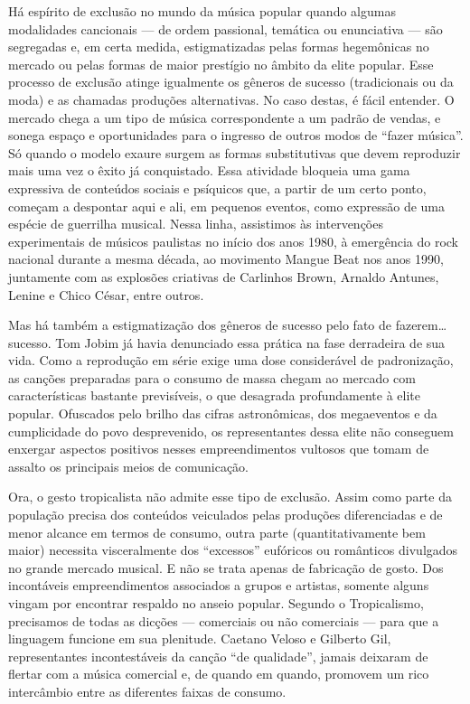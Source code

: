 Há espírito de exclusão no mundo da música popular quando algumas
modalidades cancionais --- de ordem passional, temática ou enunciativa
--- são segregadas e, em certa medida, estigmatizadas pelas formas
hegemônicas no mercado ou pelas formas de maior prestígio no âmbito da
elite popular. Esse processo de exclusão atinge igualmente os gêneros de
sucesso (tradicionais ou da moda) e as chamadas produções alternativas.
No caso destas, é fácil entender. O mercado chega a um tipo de música
correspondente a um padrão de vendas, e sonega espaço e oportunidades
para o ingresso de outros modos de ``fazer música''. Só quando o modelo
exaure surgem as formas substitutivas que devem reproduzir mais uma vez
o êxito já conquistado. Essa atividade bloqueia uma gama expressiva de
conteúdos sociais e psíquicos que, a partir de um certo ponto, começam a
despontar aqui e ali, em pequenos eventos, como expressão de uma espécie
de guerrilha musical. Nessa linha, assistimos às intervenções
experimentais de músicos paulistas no início dos anos 1980, à emergência
do rock nacional durante a mesma década, ao movimento Mangue Beat nos
anos 1990, juntamente com as explosões criativas de Carlinhos Brown,
Arnaldo Antunes, Lenine e Chico César, entre outros.

Mas há também a estigmatização dos gêneros de sucesso pelo fato de
fazerem\ldots sucesso. Tom Jobim já havia denunciado essa prática na fase
derradeira de sua vida. Como a reprodução em série exige uma dose
considerável de padronização, as canções preparadas para o consumo de
massa chegam ao mercado com características bastante previsíveis, o que
desagrada profundamente à elite popular. Ofuscados pelo brilho das
cifras astronômicas, dos megaeventos e da cumplicidade do povo
desprevenido, os representantes dessa elite não conseguem enxergar
aspectos positivos nesses empreendimentos vultosos que tomam de assalto
os principais meios de comunicação.

Ora, o gesto tropicalista não admite esse tipo de exclusão. Assim como
parte da população precisa dos conteúdos veiculados pelas produções
diferenciadas e de menor alcance em termos de consumo, outra parte
(quantitativamente bem maior) necessita visceralmente dos ``excessos''
eufóricos ou românticos divulgados no grande mercado musical. E não se
trata apenas de fabricação de gosto. Dos incontáveis empreendimentos
associados a grupos e artistas, somente alguns vingam por encontrar
respaldo no anseio popular. Segundo o Tropicalismo, precisamos de todas
as dicções --- comerciais ou não comerciais --- para que a linguagem
funcione em sua plenitude. Caetano Veloso e Gilberto Gil, representantes
incontestáveis da canção ``de qualidade'', jamais deixaram de flertar
com a música comercial e, de quando em quando, promovem um rico
intercâmbio entre as diferentes faixas de consumo.

